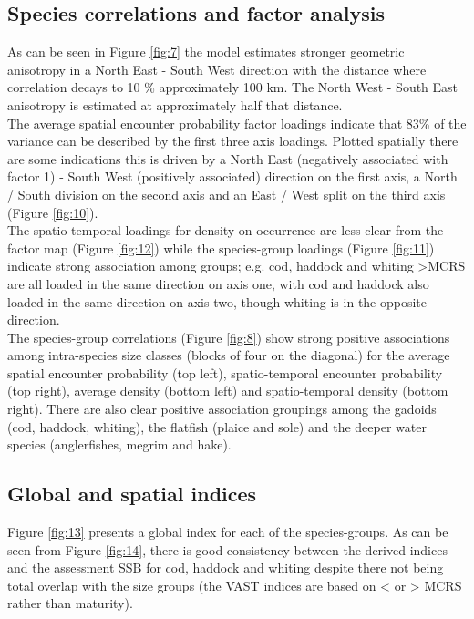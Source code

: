 \documentclass[11pt]{article}
\begin{document}
\subsection{Species correlations and factor analysis}

As can be seen in Figure \ref{fig:7} the model estimates stronger geometric
anisotropy in a North East - South West direction with the distance where
correlation decays to 10 \% approximately 100 km. The North West - South East
anisotropy is estimated at approximately half that distance. \\

The average spatial encounter probability factor loadings indicate that 83\% of
the variance can be described by the first three axis loadings. Plotted
spatially there are some indications this is driven by a North East (negatively
associated with factor 1) - South West (positively associated) direction on the
first axis, a North / South division on the second axis and an East / West
split on the third axis (Figure \ref{fig:10}).\\

The spatio-temporal loadings for density on occurrence are less clear from the
factor map (Figure \ref{fig:12}) while the species-group loadings (Figure
\ref{fig:11}) indicate strong association among groups; e.g.  cod, haddock and
whiting \textgreater MCRS are all loaded in the same direction on axis one,
with cod and haddock also loaded in the same direction on axis two, though
whiting is in the opposite direction. \\

The species-group correlations (Figure \ref{fig:8}) show strong positive
associations among intra-species size classes (blocks of four on the diagonal)
for the average spatial encounter probability (top left), spatio-temporal
encounter probability (top right), average density (bottom left) and
spatio-temporal density (bottom right). There are also clear positive
association groupings among the gadoids (cod, haddock, whiting), the flatfish
(plaice and sole) and the deeper water species (anglerfishes, megrim and hake).
\\

\subsection{Global and spatial indices}

Figure \ref{fig:13} presents a global index for each of the species-groups. As
can be seen from Figure \ref{fig:14}, there is good consistency between the
derived indices and the assessment SSB for cod, haddock and whiting despite
there not being total overlap with the size groups (the VAST indices are based
on \textless \hspace{0.1cm} or \hspace{0.1cm} \textgreater \hspace{0.1cm} MCRS
rather than maturity). \\
\end{document}
